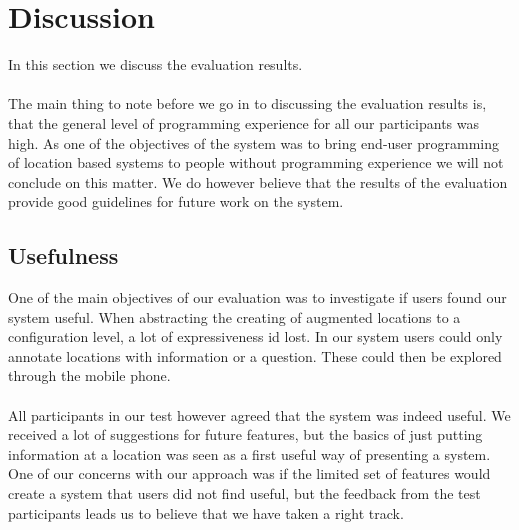 \section{Discussion} %
\label{sec:discusion}
In this section we discuss the evaluation results. 
\\\\
The main thing to note before we go in to discussing the evaluation results is, that the general level of programming experience for all our participants was high. As one of the objectives of the system was to bring end-user programming of location based systems to people without programming experience we will not conclude on this matter. We do however believe that the results of the evaluation provide good guidelines for future work on the system. 

\subsection{Usefulness} %
\label{sub:usefulness}
One of the main objectives of our evaluation was to investigate if users found our system useful. When abstracting the creating of augmented locations to a configuration level, a lot of expressiveness id lost. In our system users could only annotate locations with information or a question. These could then be explored through the mobile phone.
\\\\
All participants in our test however agreed that the system was indeed useful. We received a lot of suggestions for future features, but the basics of just putting information at a location was seen as a first useful way of presenting a system. One of our concerns with our approach was if the limited set of features would create a system that users did not find useful, but the feedback from the test participants leads us to believe that we have taken a right track.

